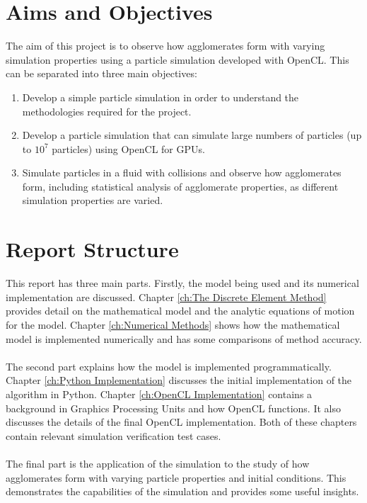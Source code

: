 \documentclass[a4paper,11pt,titlepage]{report}
\begin{document}
\section{Aims and Objectives}
\label{sec:aims and objectives}
The aim of this project is to observe how agglomerates form with varying simulation properties using a particle simulation developed with OpenCL. This can be separated into three main objectives:
\begin{enumerate}
\item Develop a simple particle simulation in order to understand the methodologies required for the project.
\item Develop a particle simulation that can simulate large numbers of particles (up to $10^7$ particles) using OpenCL for GPUs.
\item Simulate particles in a fluid with collisions and observe how agglomerates form, including statistical analysis of agglomerate properties, as different simulation properties are varied.
\end{enumerate}
\section{Report Structure}
This report has three main parts. Firstly, the model being used and its numerical implementation are discussed. Chapter \ref{ch:The Discrete Element Method} provides detail on the mathematical model and the analytic equations of motion for the model. Chapter \ref{ch:Numerical Methods} shows how the mathematical model is implemented numerically and has some comparisons of method accuracy.
\\\\The second part explains how the model is implemented programmatically. Chapter \ref{ch:Python Implementation} discusses the initial implementation of the algorithm in Python. Chapter \ref{ch:OpenCL Implementation} contains a background in Graphics Processing Units and how OpenCL functions. It also discusses the details of the final OpenCL implementation. Both of these chapters contain relevant simulation verification test cases.
\\\\The final part is the application of the simulation to the study of how agglomerates form with varying particle properties and initial conditions. This demonstrates the capabilities of the simulation and provides some useful insights.
\end{document}
